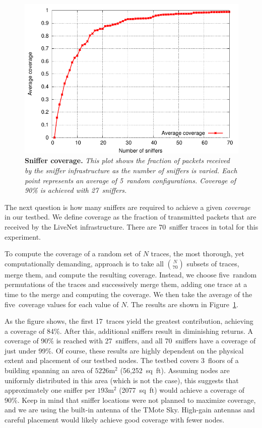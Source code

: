 \begin{figure}[t]
\begin{center}
\includegraphics[width=0.6\hsize]{./resources/livenet-sensys07/figs/coverage/validation/coverage-motelab.pdf}
\end{center}
\caption{\small {\bf Sniffer coverage.}
{\em This plot shows the fraction of packets received by the sniffer
infrastructure as the number of sniffers is varied. Each point 
represents an average of 5~random configurations. Coverage of 
90\% is achieved with 27~sniffers.}}
\label{fig-sniffer-coverage}
\end{figure}

The next question is how many sniffers are required to achieve a
given {\em coverage} in our testbed. We define coverage as the
fraction of transmitted packets that are received by the LiveNet
infrastructure. There are 70~sniffer traces in total for this experiment.

To compute the coverage of a random set of $N$ traces, the most
thorough, yet computationally demanding, approach is to take all 
$N \choose 70$ subsets of traces, merge them, and
compute the resulting coverage. Instead, we choose five~random
permutations of the traces and successively merge them, adding
one trace at a time to the merge and computing the coverage. We then
take the average of the five~coverage values for each value of $N$. 
The results are shown in Figure~\ref{fig-sniffer-coverage}. 

As the figure shows, the first 17~traces yield the greatest contribution,
achieving a coverage of 84\%. After this, additional sniffers
result in diminishing returns. A coverage of 90\% is reached with
27~sniffers, and all 70~sniffers have a coverage of just under 99\%. 
Of course, these results are highly dependent on the physical extent
and placement of our testbed nodes. The testbed covers 3~floors of a
building spanning an area of $5226 \mathrm{m}^2$ (56,252~sq~ft). 
Assuming nodes are uniformly distributed in this area (which is not
the case), this suggests that approximately one sniffer per 
$193 \mathrm{m}^2$ (2077~sq~ft) would achieve a coverage of 90\%.
Keep in mind that sniffer locations were not planned to maximize coverage, 
and we are using the built-in antenna of the TMote Sky. High-gain
antennas and careful placement would likely achieve good coverage with
fewer nodes.


